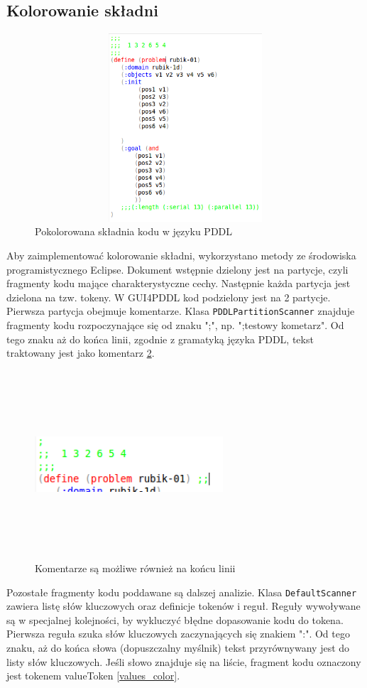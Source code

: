 \subsection{Kolorowanie składni}
\begin{figure}[h]
  \centering
    \includegraphics[width=13cm,height=7cm,keepaspectratio]{img/colored-code.png}
    \caption{Pokolorowana składnia kodu w języku PDDL}
    \label{colored-code}
\end{figure}
Aby zaimplementować kolorowanie składni, wykorzystano metody ze środowiska programistycznego Eclipse. Dokument wstępnie dzielony jest na partycje, czyli fragmenty kodu mające charakterystyczne cechy. Następnie każda partycja jest dzielona na tzw. tokeny. W GUI4PDDL kod podzielony jest na 2 partycje. Pierwsza partycja obejmuje komentarze. Klasa \texttt{PDDLPartitionScanner} znajduje fragmenty kodu rozpoczynające się od znaku ";", np.  ";testowy kometarz". Od tego znaku aż do końca linii, zgodnie z gramatyką języka PDDL, tekst traktowany jest jako komentarz \ref{comments}.
\begin{figure}[h]
  \centering
    \includegraphics[width=7cm,height=7cm,keepaspectratio]{img/comments.png}
    \caption{Komentarze są możliwe również na końcu linii}
    \label{comments}
\end{figure}
Pozostałe fragmenty kodu poddawane są dalszej analizie. Klasa \texttt{DefaultScanner} zawiera listę słów kluczowych oraz definicje tokenów i reguł. Reguły wywoływane są w specjalnej kolejności, by wykluczyć błędne dopasowanie kodu do tokena. Pierwsza reguła szuka słów kluczowych zaczynających się znakiem ":".  Od tego znaku, aż do końca słowa (dopuszczalny myślnik) tekst przyrównywany jest do listy słów kluczowych. Jeśli słowo znajduje się na liście, fragment kodu oznaczony jest tokenem valueToken \ref{values_color}.

